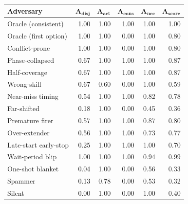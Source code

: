 \begin{tabular}{lrrrrr}
\toprule
\textbf{Adversary} & $\bm{A_{disj}}$ & $\bm{A_{act}}$ & $\bm{A_{cons}}$ & $\bm{A_{nec}}$ & $\bm{A_{score}}$ \\
\midrule
Oracle (consistent) & 1.00 & 1.00 & 1.00 & 1.00 & 1.00 \\
Oracle (first option) & 1.00 & 1.00 & 0.00 & 1.00 & 0.80 \\
Conflict-prone & 1.00 & 1.00 & 0.00 & 1.00 & 0.80 \\
Phase-collapsed & 0.67 & 1.00 & 1.00 & 1.00 & 0.87 \\
Half-coverage & 0.67 & 1.00 & 1.00 & 1.00 & 0.87 \\
Wrong-skill & 0.67 & 0.60 & 0.00 & 1.00 & 0.59 \\
Near-miss timing & 0.54 & 1.00 & 1.00 & 0.82 & 0.78 \\
Far-shifted & 0.18 & 1.00 & 0.00 & 0.45 & 0.36 \\
Premature firer & 0.57 & 1.00 & 1.00 & 0.87 & 0.80 \\
Over-extender & 0.56 & 1.00 & 1.00 & 0.73 & 0.77 \\
Late-start early-stop & 0.25 & 1.00 & 1.00 & 1.00 & 0.70 \\
Wait-period blip & 1.00 & 1.00 & 1.00 & 0.94 & 0.99 \\
One-shot blanket & 0.04 & 1.00 & 0.00 & 0.56 & 0.33 \\
Spammer & 0.13 & 0.78 & 0.00 & 0.53 & 0.32 \\
Silent & 0.00 & 1.00 & 0.00 & 1.00 & 0.40 \\
\bottomrule
\end{tabular}
